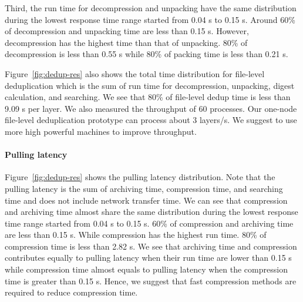 Third, the run time for decompression and unpacking have the same distribution
during the lowest response time range started from 0.04 s to 0.15 s. 
%
Around
60\% of decompression and unpacking time are less than 0.15 s. 
%
However,
decompression has the highest time than that of unpacking. 
%
80\% of
decompression is less than 0.55 s while 80\% of packing time is less than 0.21 s. 

Figure~\ref{fig:dedup-res} also shows the total time distribution for
file-level deduplication which is the sum of run time for decompression, unpacking,
digest calculation, and searching. 
%
We see that 80\% of file-level dedup time is
less than 9.09 s per layer.
%
%
We also measured the throughput of 60 processes. 
%
Our one-node file-level
deduplication prototype can process about 3 layers/s. 
%
We suggest to use more
high powerful machines to improve throughput.

\paragraph{Pulling latency} Figure~\ref{fig:dedup-res} shows the pulling latency
distribution. 
%
Note that the pulling latency is the sum of archiving time,
compression time, and searching time and does not include network transfer
time. 
%
We can see that compression and archiving time almost share the same
distribution during the lowest response time range started from 0.04 s to 0.15
s. 60\% of compression and archiving time are less than 0.15 s.
%
While
compression has the highest run time. 
%
80\% of compression time is less than 2.82 s. 
%
We see that archiving time and compression contributes equally to pulling
latency when their run time are lower than 0.15 s while compression time almost
equals to pulling latency when the compression time is greater than 0.15 s. 
%
Hence, we
suggest that fast compression methods are required to reduce compression time.  
%


%
%

%
%
%

